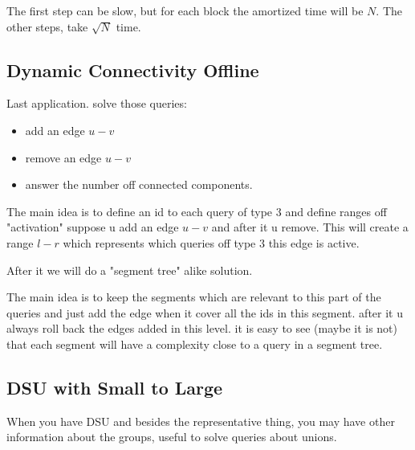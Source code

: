     The first step can be slow, but for each block the amortized time will be $N$. The other steps, take $\sqrt{N}$ time.

    

    \subsection{Dynamic Connectivity Offline}

    \tab Last application. solve those queries:
    \begin{itemize}
        \item add an edge $u - v$
        \item remove an edge $u - v$
        \item answer the number off connected components.
    \end{itemize}

    The main idea is to define an id to each query of type $3$ and define ranges off "activation" suppose u add an edge $u - v$ and after it u remove. This will create a range $l - r$ which represents which queries off type $3$ this edge is active.

    After it we will do a "segment tree" alike solution.

    The main idea is to keep the segments which are relevant to this part of the queries and just add the edge when it cover all the ids in this segment. after it u always roll back the edges added in this level. it is easy to see (maybe it is not) that each segment will have a complexity close to a query in a segment tree.

    


    \subsection{DSU with Small to Large}

    \tab When you have DSU and besides the representative thing, you may have other information about the groups, useful to solve queries about unions.

    
